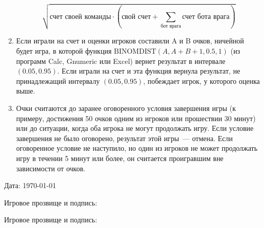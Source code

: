 \documentclass[a4paper,titlepage,12pt]{article}
\begin{document}
\begin{enumerate}
    $$ \sqrt{\text{счет своей команды} \cdot (\text{свой счет} +
        \sum\limits_{\text{бот врага}}\text{счет бота врага})} $$

\item Если играли на счет и оценки игроков составили A и B очков,
    ничейной будет игра, в которой функция
    $ \text{BINOMDIST}(A, A + B + 1, 0.5, 1) $ (из программ
    Calc, Gnumeric или Excel)
    вернет результат в интервале $ (0.05, 0.95) $.
    Если играли на счет и эта функция вернула результат, не принадлежащий
    интервалу $ (0.05, 0.95) $, побеждает игрок, у которого оценка выше.
\item Очки считаются до заранее оговоренного условия завершения игры
    (к примеру, достижения 50 очков одним из игроков или прошествии 30 минут)
    или до ситуации, когда оба игрока не могут продолжать игру.
    Если условие завершения не было оговорено,
    результат этой игры~--- отмена.
    Если оговоренное условие не наступило, но один из игроков не может
    продолжать игру в течении 5 минут или более, он считается проигравшим
    вне зависимости от очков.

\end{enumerate}

Дата: \today

Игровое прозвище и подпись:

Игровое прозвище и подпись:
\end{document}
